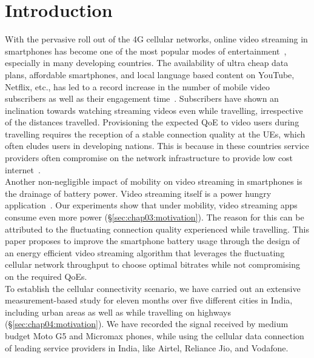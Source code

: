 \section{\textbf{Introduction}}\label{sec:chap03:intro}
With the pervasive roll out of the \ac{4G} cellular networks, online video streaming in smartphones has become one of the most popular modes of entertainment~\cite{CISCO2019}, especially in many developing countries. The availability of ultra cheap data plans, affordable smartphones, and local language based content on YouTube, Netflix, etc., has led to a record increase in the number of mobile video subscribers as well as their engagement time~\cite{Mobstat_2019}.  Subscribers have  shown an inclination towards watching streaming videos even while travelling, irrespective of the distances travelled. Provisioning the expected \ac{QoE} to video users during travelling requires the reception of a stable connection quality at the \acp{UE}, which often eludes users in developing nations. This is because in these countries service providers often compromise on the network infrastructure to provide low cost internet~\cite{Poor_Inf_2019_2}. \\
\indent Another non-negligible impact of mobility on video streaming in  smartphones is the drainage of battery power.  Video streaming itself is a power hungry application~\cite{Xin2012}. Our experiments show that under mobility, video streaming apps consume even more power (\S\ref{sec:chap03:motivation}). The reason for this can be attributed to the fluctuating connection quality experienced while travelling.  This paper proposes to improve the smartphone battery usage through the design of an energy efficient video streaming algorithm that leverages the fluctuating cellular network throughput to choose optimal bitrates while not compromising on the required \ac{QoE}s. \\
\indent To establish the cellular connectivity scenario, 
we have carried out an extensive measurement-based study for eleven months over five different cities in India, including urban areas as well as while travelling on highways (\S\ref{sec:chap04:motivation}). We have recorded the signal received by  medium budget Moto G5 and Micromax phones, while using the cellular data connection of leading service providers in India, like Airtel, Reliance Jio, and Vodafone.

